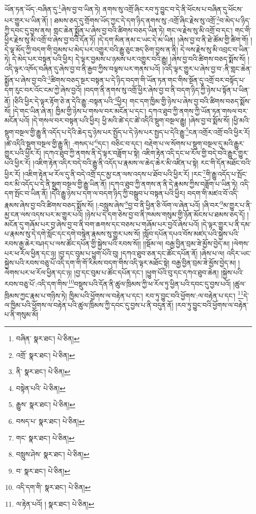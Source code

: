 ཡོན་ཏན་ཡོད་:བཞིན་དུ་\footnote{བཞིན་  སྣར་ཐང་།  པེ་ཅིན། }ཞེས་བྱ་བ་ཡིན་ཏེ། ནགས་སུ་འགྲོ་ཞིང་རབ་ཏུ་བྱུང་བ་དེ་ནི་ཕོངས་པ་བཞིན་དུ་ཕོངས་པར་གྱུར་པ་ཡིན་ནོ། །
ཐམས་ཅད་དུ་གྲོགས་ཡོད་ཀྱང་དེ་དག་ཉིད་ནགས་སུ་:འགྲོ་ཞིང་རྗེས་སུ་འགྲོ་\footnote{འགྲོ་  སྣར་ཐང་།  པེ་ཅིན། }བ་མེད་པ་ཉིད་ཀྱི་དབང་དུ་བྱས་ནས། གླང་ཆེན་སྨྱོན་པ་ཞེས་བྱ་བའི་ཚིགས་བཅད་ཡིན་ཏེ། གང་ལ་རྗེས་སུ་མི་འགྲོ་བ་དང་། གང་གི་ཕྱིར་རྗེས་སུ་མི་འགྲོ་བ་ཞེས་བྱ་བའི་དོན་ཏོ། །དེ་དག་མིན་ནམ་ང་ཡང་དེ་མ་ཡིན། །ཞེས་བྱ་བ་ནི་ཐེ་ཚོམ་གྱི་ཚིག་གོ། །དེ་ལྟ་མོད་ཀྱི་བདག་གི་བྱམས་པ་མེད་པར་འགྱུར་བའི་རྒྱུ་ཅུང་ཟད་ཅིག་བྱས་ན་ནི། དེ་ལས་རྗེས་སུ་མི་འབྲང་བ་ཡིན་ཏེ། དེ་མེད་པར་བསྟན་པའི་ཕྱིར། དེ་ལྟར་བྱམས་པ་ཉམས་པར་འགྱུར་བའི་རྒྱུ། །ཞེས་བྱ་བའི་ཚིགས་བཅད་སྨོས་སོ། །འདི་ལྟར་འཁོད་བཞིན་དུ་ཞེས་བྱ་བ་ནི་རྒྱབ་ཀྱིས་བལྟས་པར་གནས་པའོ། །འདི་ལྟར་གྱུར་པ་ཞེས་བྱ་བ་:ནི་གླང་ཆེན་སྨྱོན་པ་ཞེས་བྱ་བའི་\footnote{ནི་  སྣར་ཐང་།  པེ་ཅིན། }ཚིགས་བཅད་སྔར་བསྟན་པ་དེ་ཉིད་བདག་གི་ཡོན་ཏན་གང་གིས་སྔོན་དུ་འགྲོ་བར་བསྟོད་པ་དག་རུང་བར་འོང་ངམ་ཀྱེ་ཞེས་བྱའོ། །བདག་ནི་ནགས་སུ་འགྲོ་ཕྱིར་ཞེས་བྱ་བ་ནི་བདག་ཉིད་ཀྱི་ཉེས་པ་སྟོན་པ་ཡིན་ནོ། །ཅིའི་ཕྱིར་དེ་ལྟར་རྟོག་ཅེ་ན་དེའི་རྒྱུ་:བསྟན་པའི་\footnote{བསྟེན་པའི་  པེ་ཅིན། }ཕྱིར། གང་དག་ཁྱིམ་གྱི་ཉེས་པ་ཞེས་བྱ་བའི་ཚིགས་བཅད་སྨོས་སོ། །དེ་གང་ཡིན་ཞེ་ན། ཁྱིམ་གྱི་ཉེས་པ་གསལ་བར་མངོན་པ་དང་། དཀའ་ཐུབ་ཀྱི་ནགས་ཀྱི་ཡོན་ཏན་གསལ་བར་མངོན་པའོ། །དེ་གསལ་བར་བསྟན་པའི་ཕྱིར། ཕྱི་མའི་ཚེ་དང་ཚེ་འདིའི་སྡུག་བསྔལ་རྒྱུ། །ཞེས་བྱ་བ་སྨོས་སོ། །ཕྱི་མའི་སྡུག་བསྔལ་གྱི་རྒྱུ་ནི་འདོད་པ་དེའི་ཆེད་དུ་ཉེས་པར་སྤྱོད་པ་དེ་ཉེས་པར་སྤྱད་པ་དེའི་རྒྱུ་\footnote{རྒྱུས་  སྣར་ཐང་།  པེ་ཅིན། }ངན་འགྲོར་འགྲོ་བའི་ཕྱིར་རོ། །ཚེ་འདིའི་སྡུག་བསྔལ་གྱི་རྒྱུ་ནི། :གསད་པ་\footnote{བསད་པ་  སྣར་ཐང་།  པེ་ཅིན། }དང་། བཅིང་བ་དང་། བརྡེག་པ་ལ་སོགས་པ་སྡུག་བསྔལ་དུ་མའི་རྒྱུར་གྱུར་པའི་ཕྱིར་རོ། །དཀའ་ཐུབ་ཀྱི་ནགས་ནི་དེ་ལྟར་བཟློག་པ་སྟེ། འཇིག་རྟེན་འདི་དང་ཕ་རོལ་གྱི་བདེ་བའི་རྒྱུར་གྱུར་པའི་ཕྱིར་རོ། །འཇིག་རྟེན་འདིར་བདེ་བའི་རྒྱུ་ནི་འདོད་པ་རྣམས་ལ་ཆེད་ཆེར་མི་འཛིན་པ་སྟེ། རང་གི་དོན་མཐོང་བའི་ཕྱིར་རོ། །འཇིག་རྟེན་ཕ་རོལ་དུ་ནི་བདེ་འགྲོ་དང་མྱ་ངན་ལས་འདས་པ་ཐོབ་པའི་ཕྱིར་རོ། །རང་\footnote{གང་  སྣར་ཐང་།  པེ་ཅིན། }གི་རྒྱུ་འདོད་པ་སྤོང་བར་མི་འདོད་པ་དེ་ནི་སྡུག་བསྔལ་གྱི་རྒྱུ་ཡིན་ནོ། །དཀའ་ཐུབ་ཀྱི་ནགས་ན་ནི་དེ་རྣམས་ཀྱིས་བཟློག་པ་ཡིན་ཏེ། འདི་དག་སྤོང་བ་ཡིན་ནོ། །དེའི་རྒྱུ་ཉེས་པ་དག་ལ་བདག་ཉིད་ཀྱི་བསྒྲུབ་པ་བསྟན་པའི་ཕྱིར། བདག་གི་མཛའ་བོ་འདི་རྣམས་ཞེས་བྱ་བའི་ཚིགས་བཅད་སྨོས་སོ། །:བསླུས་ཞེས་\footnote{བསླུས་ཤེས་  སྣར་ཐང་།  པེ་ཅིན། }བྱ་བ་ནི་ཕྱིན་ཅི་ལོག་ལ་ཞེན་པའོ། །ཞི་བར་\footnote{བ་  སྣར་ཐང་།  པེ་ཅིན། }མ་གྱུར་པ་ནི་མྱ་ངན་ལས་འདས་པར་མ་གྱུར་པའོ། །ཉེས་པ་དེ་དག་ཅེས་བྱ་བ་ནི་ཁམས་གསུམ་གྱི་ཉོན་མོངས་པ་ཐམས་ཅད་དོ། །མངོན་དུ་གཞོམ་པར་བྱ་ཞེས་བྱ་བ་ནི་བག་ཆགས་དང་བཅས་པ་གཞོམ་པར་བྱའོ་ཞེས་པའོ། །དེ་ལྟར་གྱུར་པ་ནི་དམ་པ་རྣམས་སུ་དེ་དགེ་སློང་དང་དགེ་བསྙེན་རྣམས་སུ་གྱུར་པས་སོ། །སློབ་དཔོན་དཔའ་བོས་མཛད་པའི་སྐྱེས་པའི་རབས་རྒྱ་ཆེར་བཤད་པ་ལས་ཚོང་དཔོན་གྱི་སྐྱེས་པའི་རབས་སོ།། །།སྡོམ་ལ། བརྒྱ་བྱིན་བྲམ་ཟེ་མྱོས་བྱེད་མ། །ལེགས་པར་ཕ་རོལ་ཕྱིན་དང་ཉ། །བྱ་དང་བུམ་པ་ཕྱུག་པོའི་བུ། །དཀའ་ཐུབ་ཅན་དང་ཚོང་དཔོན་ནོ། །ཞེས་པ་ལ། འདིར་ཡང་སྐྱེས་པའི་རབས་བཅུ་པོ་འདི་དག་གི་གོ་རིམས་བདག་གིས་འདི་ལྟར་མཐོང་སྟེ། བརྒྱ་བྱིན་བྲམ་ཟེ་མྱོས་བྱེད་མ། །ལེགས་པར་ཕ་རོལ་ཕྱིན་དང་ཉ། །བྱ་དང་བུམ་པ་ཚོང་དཔོན་དང་། །ཕྱུག་པོའི་བུ་དང་དཀའ་ཐུབ་ཆེན། །སྐྱེས་པའི་རབས་བཅུ་པོ་:འདི་དག་གིས་\footnote{འདི་དག་གི་  སྣར་ཐང་།  པེ་ཅིན། }བསྡུས་པའི་དོན་ནི་ཚུལ་ཁྲིམས་ཀྱི་ཕ་རོལ་ཏུ་ཕྱིན་པའི་དབང་དུ་བྱས་པའོ། །ཚུལ་ཁྲིམས་ཀྱང་རྣམ་པ་གཉིས་ཏེ། ཁྱིམ་པའི་ཕྱོགས་ལ་བརྟེན་པ་དང་། རབ་ཏུ་བྱུང་བའི་ཕྱོགས་:ལ་བརྟེན་པ་དང་། \footnote{ལ་རྟེན་པའོ། །   སྣར་ཐང་།  པེ་ཅིན། }དེ་ལ་ཁྱིམ་པའི་ཕྱོགས་ལ་བརྟེན་པའི་ཚུལ་ཁྲིམས་ཀྱི་དབང་དུ་བྱས་པ་ནི་བདུན་ནོ། །རབ་ཏུ་བྱུང་བའི་ཕྱོགས་ལ་བརྟེན་པ་ནི་གསུམ་མོ། 